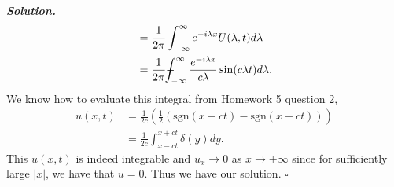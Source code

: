 \documentclass[12pt]{report}
\newenvironment{solution}[1][\it{Solution}]{\textbf{#1. } }{$\square$}
\newcommand{\paren}[1]{{\left(#1\right)}} %
\def\Xint#1{\mathchoice
   {\XXint\displaystyle\textstyle{#1}}%
   {\XXint\textstyle\scriptstyle{#1}}%
   {\XXint\scriptstyle\scriptscriptstyle{#1}}%
   {\XXint\scriptscriptstyle\scriptscriptstyle{#1}}%
   \!\int}
\def\XXint#1#2#3{{\setbox0=\hbox{$#1{#2#3}{\int}$}
     \vcenter{\hbox{$#2#3$}}\kern-.5\wd0}}
\def\dashint{\Xint-}
\begin{document}
\begin{solution}
\begin{align*}
        &= \frac{1}{2\pi}\int_{-\infty}^{\infty}e^{-i\lambda x}U(\lambda,t)d\lambda\\
        &= \frac{1}{2\pi}\dashint_{-\infty}^\infty \frac{e^{-i\lambda x}}{c\lambda}\sin(c\lambda t)d\lambda.
    \end{align*}
    We know how to evaluate this integral from Homework 5 question 2,
    \begin{align*}
        u(x,t) &= \frac{1}{2c}\paren{\frac{1}{2}\paren{\text{sgn}(x + ct) - \text{sgn}(x -ct)}}\\
        &= \frac{1}{2c}\int_{x - ct}^{x + ct}\delta(y)dy.
    \end{align*}
    This $u(x,t)$ is indeed integrable and $u_x \to 0$ as $x \to \pm \infty$ since for sufficiently large $|x|$, we have that $u = 0$. Thus we have our solution.
\end{solution}

\newpage
\end{document}
